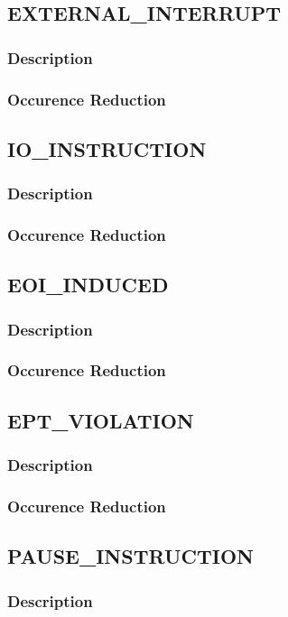 \documentclass[MMR,Master,english]{twbook}
\begin{document}
\subsection{EXTERNAL\_INTERRUPT}
\subsubsection{Description}
\subsubsection{Occurence Reduction}
\clearpage
\subsection{IO\_INSTRUCTION}
\subsubsection{Description}
\subsubsection{Occurence Reduction}
\clearpage
\subsection{EOI\_INDUCED}
\subsubsection{Description}
\subsubsection{Occurence Reduction}
\clearpage
\subsection{EPT\_VIOLATION}
\subsubsection{Description}
\subsubsection{Occurence Reduction}
\clearpage
\subsection{PAUSE\_INSTRUCTION}
\subsubsection{Description}
\end{document}
